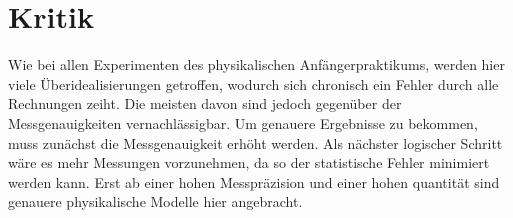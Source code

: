 \section{Kritik}
Wie bei allen Experimenten des physikalischen Anfängerpraktikums, werden hier viele Überidealisierungen getroffen, wodurch sich chronisch ein Fehler durch alle Rechnungen zeiht. Die meisten davon sind jedoch gegenüber der Messgenauigkeiten vernachlässigbar. Um genauere Ergebnisse zu bekommen, muss zunächst die Messgenauigkeit erhöht werden. Als nächster logischer Schritt wäre es mehr Messungen vorzunehmen, da so der statistische Fehler minimiert werden kann. Erst ab einer hohen Messpräzision und einer hohen quantität sind genauere physikalische Modelle hier angebracht.